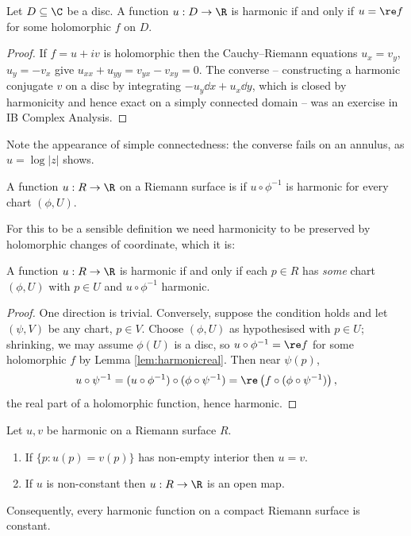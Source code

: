 \begin{lemma}\label{lem:harmonicreal}
	Let $D \subseteq \C$ be a disc. A function $u : D \to \R$ is harmonic if and only if
	$u = \re f$ for some holomorphic $f$ on $D$.
\end{lemma}

\begin{proof}
	If $f = u + iv$ is holomorphic then the Cauchy--Riemann equations $u_x = v_y$,
	$u_y = -v_x$ give $u_{xx} + u_{yy} = v_{yx} - v_{xy} = 0$. The converse -- constructing
	a harmonic conjugate $v$ on a disc by integrating $-u_y\dd x + u_x \dd y$, which is
	closed by harmonicity and hence exact on a simply connected domain -- was an exercise
	in IB Complex Analysis.
\end{proof}

Note the appearance of simple connectedness: the converse fails on an annulus, as
$u = \log|z|$ shows.

\begin{definition}
	A function $u : R \to \R$ on a Riemann surface is  if $u \circ \phi^{-1}$
	is harmonic for every chart $(\phi, U)$.
\end{definition}

For this to be a sensible definition we need harmonicity to be preserved by holomorphic
changes of coordinate, which it is:

\begin{lemma}\label{lem:harmoniconechart}
	A function $u : R \to \R$ is harmonic if and only if each $p \in R$ has \emph{some}
	chart $(\phi, U)$ with $p \in U$ and $u \circ \phi^{-1}$ harmonic.
\end{lemma}

\begin{proof}
	One direction is trivial. Conversely, suppose the condition holds and let $(\psi, V)$
	be any chart, $p \in V$. Choose $(\phi, U)$ as hypothesised with $p \in U$; shrinking,
	we may assume $\phi(U)$ is a disc, so $u\circ\phi^{-1} = \re f$ for some holomorphic $f$
	by Lemma \ref{lem:harmonicreal}. Then near $\psi(p)$,
	$$
	u \circ \psi^{-1} = (u \circ \phi^{-1})\circ(\phi\circ\psi^{-1}) = \re\left(f \circ (\phi \circ \psi^{-1})\right),
	$$
	the real part of a holomorphic function, hence harmonic.
\end{proof}

\begin{theorem}
	Let $u, v$ be harmonic on a Riemann surface $R$.
	\begin{enumerate}[label=(\roman*)]
		\item If $\{p : u(p) = v(p)\}$ has non-empty interior then $u = v$.
		\item If $u$ is non-constant then $u : R \to \R$ is an open map.
	\end{enumerate}
	Consequently, every harmonic function on a compact Riemann surface is constant.
\end{theorem}

